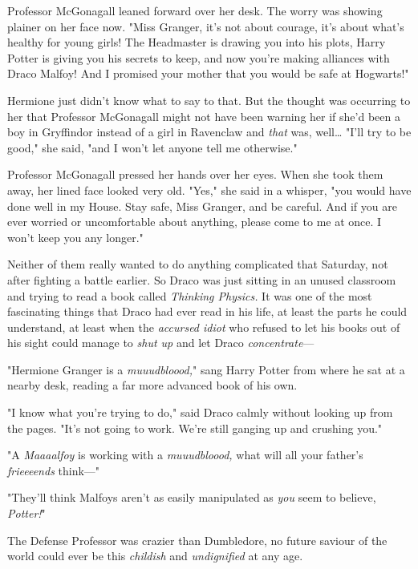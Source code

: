 Professor McGonagall leaned forward over her desk. The worry was showing
plainer on her face now. "Miss Granger, it's not about courage, it's about
what's healthy for young girls! The Headmaster is drawing you into his plots,
Harry Potter is giving you his secrets to keep, and now you're making alliances
with Draco Malfoy! And I promised your mother that you would be safe at
Hogwarts!"

Hermione just didn't know what to say to that. But the thought was occurring to
her that Professor McGonagall might not have been warning her if she'd been a
boy in Gryffindor instead of a girl in Ravenclaw and \emph{that} was,
well{\ldots} "I'll try to be good," she said, "and I won't let anyone tell me
otherwise."

Professor McGonagall pressed her hands over her eyes. When she took them away,
her lined face looked very old. "Yes," she said in a whisper, "you would have
done well in my House. Stay safe, Miss Granger, and be careful. And if you are
ever worried or uncomfortable about anything, please come to me at once. I
won't keep you any longer."

Neither of them really wanted to do anything complicated that Saturday, not
after fighting a battle earlier. So Draco was just sitting in an unused
classroom and trying to read a book called \emph{Thinking Physics.} It was one
of the most fascinating things that Draco had ever read in his life, at least
the parts he could understand, at least when the \emph{accursed idiot} who
refused to let his books out of his sight could manage to \emph{shut up} and
let Draco \emph{concentrate}---

"Hermione Granger is a \emph{muuudbloood,}" sang Harry Potter from where he sat
at a nearby desk, reading a far more advanced book of his own.

"I know what you're trying to do," said Draco calmly without looking up from
the pages. "It's not going to work. We're still ganging up and crushing you."

"A \emph{Maaaalfoy} is working with a \emph{muuudbloood,} what will all your
father's \emph{frieeeends} think---"

"They'll think Malfoys aren't as easily manipulated as \emph{you} seem to
believe, \emph{Potter!}"

The Defense Professor was crazier than Dumbledore, no future saviour of the
world could ever be this \emph{childish} and \emph{undignified} at any age.

